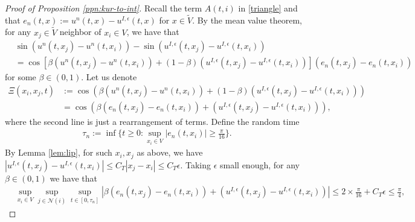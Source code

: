\documentclass[a4paper,11pt]{amsart}
\newcommand{\red}[1]{{#1}}
\newcommand{\ep}{\epsilon}
\newcommand{\cN}{\mathcal{N}}
\numberwithin{equation}{section}
\numberwithin{theorem}{section}
\theoremstyle{definition}
\begin{document}
\begin{proof}[Proof of Proposition \ref{ppn:kur-to-int}]
Recall the term $A(t,i)$ in \eqref{triangle} and that $e_n(t,x):=u^{n}(t,x)-u^{I,\ep}(t,x)$ for $x\in\tilde V$. 
By the mean value theorem, for any $x_j\in\tilde V$ neighbor of $x_i\in V$, we have that 
\begin{align*}
&\sin \left(u^{n}(t,x_j)-u^{n}(t,x_i)\right)-\sin \left(u^{I,\ep}(t,x_j)-u^{I,\ep}(t,x_i)\right)\\
&=\cos \left[\beta\left(u^{n}(t,x_j)-u^{n}(t,x_i)\right)+(1-\beta)\left(u^{I,\ep}(t,x_j)-u^{I,\ep}(t,x_i)\right)\right]\left(e_n(t,x_j)-e_n(t,x_i)\right)
\end{align*}
for some $\beta\in(0,1)$. Let us denote
\begin{align*}
\Xi(x_i,x_j, t)&:=\cos\left(\beta\left(u^{n}(t,x_j)-u^{n}(t,x_i)\right)+(1-\beta)\left(u^{I,\ep}(t,x_j)-u^{I,\ep}(t,x_i)\right)\right)\\
&=\cos\left(\beta\left(e_n(t,x_j)-e_n(t,x_i)\right)+\left(u^{I,\ep}(t,x_j)-u^{I,\ep}(t,x_i)\right)\right),
\end{align*}
where the second line is just a rearrangement of terms.
Define the random time
\begin{align*}
\tau_n:=\inf\Big\{t\ge0: \sup_{x_i\in V}\left|e_n\left(t,x_i\right)\right|\ge\frac{\pi}{16}\Big\}.
\end{align*}
By Lemma \ref{lem:lip}, for such $x_i,x_j$ as above, we have $|u^{I,\ep}(t,x_j)-u^{I,\ep}(t,x_i)|\le C_T|x_j-x_i|\le C_T\ep$. Taking $\ep$ small enough, %
for any $\beta\in(0,1)$ we have that 
\begin{align*}
&\sup_{x_i\in V}\sup_{j\in\cN(i)}\sup_{t\in[0,\tau_n]}\left|\beta\left(e_n(t,x_j)-e_n(t,x_i)\right)+\left(u^{I,\ep}(t,x_j)-u^{I,\ep}(t,x_i)\right)\right|\le2\times\frac{\pi}{16}+C_T\ep\le \frac{\pi}{4},

\end{align*}
\end{proof}
\end{document}
